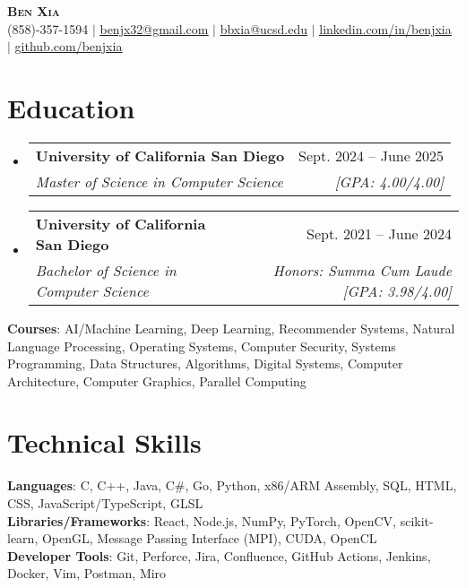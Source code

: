 \documentclass[letterpaper, 10pt]{article}
\makeatletter
\newcommand{\resumeSubheading}[4]{
  \vspace{4pt}\item
    \begin{tabular*}{0.97\textwidth}[t]{l@{\extracolsep{\fill}}r}
      \textbf{#1} & #2 \\
      \textit{#3} & \textit{\small #4} \\
    \end{tabular*}\vspace{-7pt}
}
\newcommand{\resumeSubHeadingListStart}{\begin{itemize}[leftmargin=0.15in, label={}]}
\newcommand{\resumeSubHeadingListEnd}{\end{itemize}}
\makeatother
\begin{document}

\begin{center}
  \textbf{\huge \scshape Ben Xia} \uline{} \\ \vspace{1pt}
  \small (858)-357-1594 $|$
  \href{mailto:benjx32@gmail.com}{\uline{benjx32@gmail.com}} $|$
  \href{mailto:bbxia@ucsd.edu}{\uline{bbxia@ucsd.edu}} $|$
  \href{https://linkedin.com/in/benjxia}{\uline{linkedin.com/in/benjxia}} $|$
  \href{https://github.com/benjxia}{\uline{github.com/benjxia}}
\end{center}



\section{Education}
  \resumeSubHeadingListStart
  \resumeSubheading
      {University of California San Diego}{Sept. 2024 -- June 2025}
      {Master of Science in Computer Science}{[GPA: 4.00/4.00]}
  \resumeSubheading
      {University of California San Diego}{Sept. 2021 -- June 2024}
      {Bachelor of Science in Computer Science}{Honors: Summa Cum Laude [GPA: 3.98/4.00]}
  \resumeSubHeadingListEnd
  \begin{itemize}[leftmargin=0.15in, label={}]
    \small{\item{
     \textbf{Courses}{: AI/Machine Learning, Deep Learning, Recommender Systems, Natural Language Processing, Operating Systems, Computer Security, Systems Programming, Data Structures, Algorithms, Digital Systems, Computer Architecture, Computer Graphics, Parallel Computing } \\
    }}
 \end{itemize}

%
\section{Technical Skills}
 \begin{itemize}[leftmargin=0.15in, label={}]
    \small{\item{
     \textbf{Languages}{: C, C++, Java, C\#, Go, Python, x86/ARM Assembly, SQL, HTML, CSS, JavaScript/TypeScript, GLSL } \\
     \textbf{Libraries/Frameworks}{: React, Node.js, NumPy, PyTorch, OpenCV, scikit-learn, OpenGL, Message Passing Interface (MPI), CUDA, OpenCL } \\
     \textbf{Developer Tools}{: Git, Perforce, Jira, Confluence, GitHub Actions, Jenkins, Docker, Vim, Postman, Miro} \\
    }}
 \end{itemize}
\end{document}

